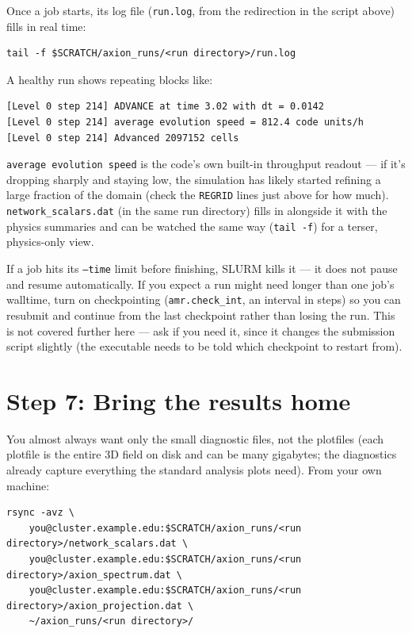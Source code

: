 \documentclass[11pt]{article}
\begin{document}
Once a job starts, its log file (\texttt{run.log}, from the redirection in the script above) fills in
real time:

\begin{lstlisting}
tail -f $SCRATCH/axion_runs/<run directory>/run.log
\end{lstlisting}

A healthy run shows repeating blocks like:

\begin{lstlisting}
[Level 0 step 214] ADVANCE at time 3.02 with dt = 0.0142
[Level 0 step 214] average evolution speed = 812.4 code units/h
[Level 0 step 214] Advanced 2097152 cells
\end{lstlisting}

\texttt{average evolution speed} is the code's own built-in throughput readout --- if it's dropping sharply
and staying low, the simulation has likely started refining a large fraction of the domain (check the
\texttt{REGRID} lines just above for how much). \texttt{network\_scalars.dat} (in the same run directory)
fills in alongside it with the physics summaries and can be watched the same way (\texttt{tail -f}) for a
terser, physics-only view.

\begin{warn}
If a job hits its \texttt{--time} limit before finishing, SLURM kills it --- it does not pause and resume
automatically. If you expect a run might need longer than one job's walltime, turn on checkpointing
(\texttt{amr.check\_int}, an interval in steps) so you can resubmit and continue from the last checkpoint
rather than losing the run. This is not covered further here --- ask if you need it, since it changes the
submission script slightly (the executable needs to be told which checkpoint to restart from).
\end{warn}

\section{Step 7: Bring the results home}
\label{sec:getting-data-back}

You almost always want only the small diagnostic files, not the plotfiles (each plotfile is the entire 3D
field on disk and can be many gigabytes; the diagnostics already capture everything the standard analysis
plots need). From your own machine:

\begin{lstlisting}
rsync -avz \
    you@cluster.example.edu:$SCRATCH/axion_runs/<run directory>/network_scalars.dat \
    you@cluster.example.edu:$SCRATCH/axion_runs/<run directory>/axion_spectrum.dat \
    you@cluster.example.edu:$SCRATCH/axion_runs/<run directory>/axion_projection.dat \
    ~/axion_runs/<run directory>/
\end{lstlisting}
\end{document}
